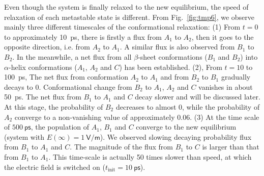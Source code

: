 \documentclass[a4paper,preprint,unsortedaddress,onecolumn]{revtex4-1}
\begin{document}
Even though the system is finally relaxed to the new equilibrium,
the speed of relaxation of each metastable state is different. 
From Fig.~\ref{fig:tmp6}, we observe mainly
three different timescales of the conformational relaxation:
(1) From
$t=0$ to approximately 10~\textsf{ps}, there is firstly
a flux from $A_1$ to $A_2$, then it goes to the opposite direction, i.e.
from $A_2$ to $A_1$.
A similar flux is also observed from $B_1$ to $B_2$.
In the meanwhile, a net flux from all $\beta$-sheet conformations
($B_1$ and $B_2$) into $\alpha$-helix conformations ($A_1$, $A_2$ and
$C$) has been established.
(2), From $t=10$ to
100~\textsf{ps},
The net flux from  conformation $A_2$ to $A_1$ and from $B_2$ to $B_1$
gradually decays to 0. Conformational change from $B_2$ to $A_1$, $A_2$ and $C$
vanishes in about 50~ps.
The net flux from $B_1$  to $A_1$ and $C$ decay slower and 
will be discussed later.
At this stage, the probability of $B_2$ decreases to almost 0,
while the probability of $A_2$
converge to a non-vanishing value of approximately 0.06.
(3) At the time scale of $
500~\textsf{ps}$, the population of $A_1$, $B_1$ and $C$ converge to
the new equilibrium (system with $E(\infty) = 1~\textsf{V/m}$).
We observed slowing decaying probability flux from $B_1$ 
to $A_1$ and $C$.
The magnitude of the flux from $B_1$ to  $C$ is larger than that from  $B_1$ to  $A_1$.
This time-scale is actually 50 times slower than speed, at which
the electric field is switched on ($t_{\textrm{init}} = 10~\textsf{ps}$).
\end{document}
